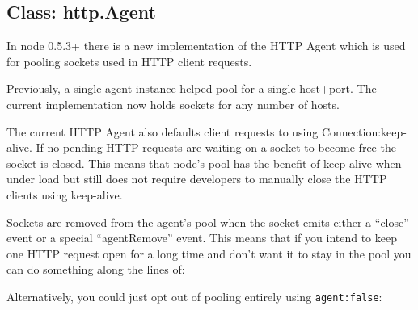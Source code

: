 \subsection{Class: http.Agent}

In node 0.5.3+ there is a new implementation of the HTTP Agent which is
used for pooling sockets used in HTTP client requests.

Previously, a single agent instance helped pool for a single host+port.
The current implementation now holds sockets for any number of hosts.

The current HTTP Agent also defaults client requests to using
Connection:keep-alive. If no pending HTTP requests are waiting on a
socket to become free the socket is closed. This means that node's pool
has the benefit of keep-alive when under load but still does not require
developers to manually close the HTTP clients using keep-alive.

Sockets are removed from the agent's pool when the socket emits either a
``close'' event or a special ``agentRemove'' event. This means that if
you intend to keep one HTTP request open for a long time and don't want
it to stay in the pool you can do something along the lines of:

\begin{Shaded}
\begin{Highlighting}[]
\NormalTok{(}\NormalTok{, } 
  \NormalTok{(}\NormalTok{);}
\NormalTok{\});}
\end{Highlighting}
\end{Shaded}

Alternatively, you could just opt out of pooling entirely using
\texttt{agent:false}:

\begin{Shaded}
\begin{Highlighting}[]
\NormalTok{(\{}\NormalTok{:}\NormalTok{, }\NormalTok{:}\NormalTok{, }\NormalTok{:}\NormalTok{, }\NormalTok{:}\NormalTok{\}, } 
\NormalTok{\})}
\end{Highlighting}
\end{Shaded}

